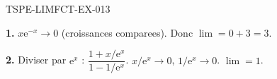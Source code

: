 \begin{corrige}{TSPE-LIMFCT-EX-013}

\textbf{1.} $x\mathrm{e}^{-x} \to 0$ (croissances comparees). Donc $\lim = 0 + 3 = \boxed{3}$.

\textbf{2.} Diviser par $\mathrm{e}^x$ : $\dfrac{1 + x/\mathrm{e}^x}{1 - 1/\mathrm{e}^x}$. $x/\mathrm{e}^x \to 0$, $1/\mathrm{e}^x \to 0$. $\lim = \boxed{1}$.

\end{corrige}
